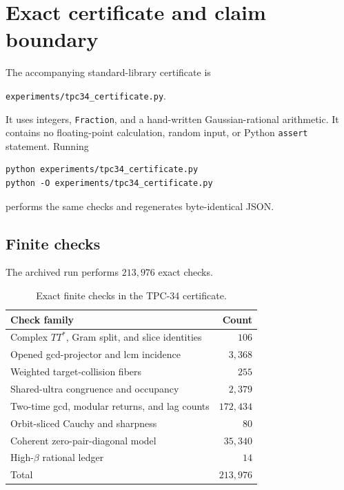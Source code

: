 \section{Exact certificate and claim boundary}
\label{sec:tpc34-certificate-scope}

The accompanying standard-library certificate is
\begin{center}
 \texttt{experiments/tpc34\_certificate.py}.
\end{center}
It uses integers, \texttt{Fraction}, and a hand-written
Gaussian-rational arithmetic.  It contains no floating-point calculation,
random input, or Python \texttt{assert} statement.  Running
\begin{verbatim}
python experiments/tpc34_certificate.py
python -O experiments/tpc34_certificate.py
\end{verbatim}
performs the same checks and regenerates byte-identical JSON.

\subsection{Finite checks}

The archived run performs \(213{,}976\) exact checks.

\begin{table}[H]
\centering
\caption{Exact finite checks in the TPC-34 certificate.}
\label{tab:tpc34-certificate-counts}
\begin{tabular}{@{}lr@{}}
\toprule
Check family & Count \\
\midrule
Complex \(TT^*\), Gram split, and slice identities & \(106\) \\
Opened gcd-projector and lcm incidence & \(3{,}368\) \\
Weighted target-collision fibers & \(255\) \\
Shared-ultra congruence and occupancy & \(2{,}379\) \\
Two-time gcd, modular returns, and lag counts & \(172{,}434\) \\
Orbit-sliced Cauchy and sharpness & \(80\) \\
Coherent zero-pair-diagonal model & \(35{,}340\) \\
High-\(\beta\) rational ledger & \(14\) \\
\midrule
Total & \(213{,}976\) \\
\bottomrule
\end{tabular}
\end{table}

